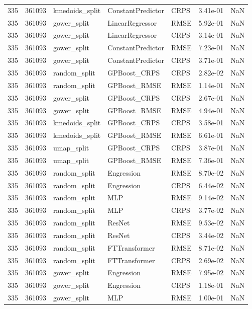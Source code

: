 \begin{tabular}{rrlllrr}
335 & 361093 & kmedoids\_split & ConstantPredictor & CRPS & 3.41e-01 & NaN \\
335 & 361093 & gower\_split & LinearRegressor & RMSE & 5.92e-01 & NaN \\
335 & 361093 & gower\_split & LinearRegressor & CRPS & 3.14e-01 & NaN \\
335 & 361093 & gower\_split & ConstantPredictor & RMSE & 7.23e-01 & NaN \\
335 & 361093 & gower\_split & ConstantPredictor & CRPS & 3.71e-01 & NaN \\
335 & 361093 & random\_split & GPBoost\_CRPS & CRPS & 2.82e-02 & NaN \\
335 & 361093 & random\_split & GPBoost\_RMSE & RMSE & 1.14e-01 & NaN \\
335 & 361093 & gower\_split & GPBoost\_CRPS & CRPS & 2.67e-01 & NaN \\
335 & 361093 & gower\_split & GPBoost\_RMSE & RMSE & 4.94e-01 & NaN \\
335 & 361093 & kmedoids\_split & GPBoost\_CRPS & CRPS & 3.58e-01 & NaN \\
335 & 361093 & kmedoids\_split & GPBoost\_RMSE & RMSE & 6.61e-01 & NaN \\
335 & 361093 & umap\_split & GPBoost\_CRPS & CRPS & 3.87e-01 & NaN \\
335 & 361093 & umap\_split & GPBoost\_RMSE & RMSE & 7.36e-01 & NaN \\
335 & 361093 & random\_split & Engression & RMSE & 8.70e-02 & NaN \\
335 & 361093 & random\_split & Engression & CRPS & 6.44e-02 & NaN \\
335 & 361093 & random\_split & MLP & RMSE & 9.14e-02 & NaN \\
335 & 361093 & random\_split & MLP & CRPS & 3.77e-02 & NaN \\
335 & 361093 & random\_split & ResNet & RMSE & 9.53e-02 & NaN \\
335 & 361093 & random\_split & ResNet & CRPS & 3.44e-02 & NaN \\
335 & 361093 & random\_split & FTTransformer & RMSE & 8.71e-02 & NaN \\
335 & 361093 & random\_split & FTTransformer & CRPS & 2.69e-02 & NaN \\
335 & 361093 & gower\_split & Engression & RMSE & 7.95e-02 & NaN \\
335 & 361093 & gower\_split & Engression & CRPS & 1.18e-01 & NaN \\
335 & 361093 & gower\_split & MLP & RMSE & 1.00e-01 & NaN \\

\end{tabular}

